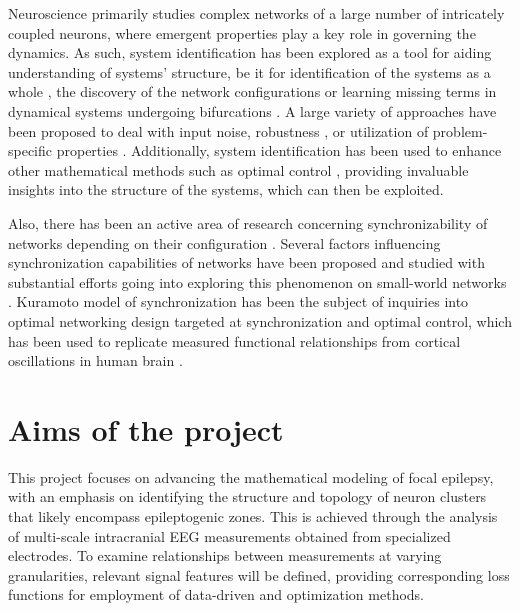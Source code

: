 \documentclass[a4paper,11pt]{scrartcl}
\begin{document}
Neuroscience primarily studies complex networks of a large number of intricately coupled neurons, where emergent properties play a key role in governing the dynamics. As such, system identification has been explored as a tool for aiding understanding of systems' structure, be it for identification of the systems as a whole \cite{Brunton2016}, the discovery of the network configurations \cite{Owens2022} or learning missing terms in dynamical systems undergoing bifurcations \cite{VortmeyerKley2021}. A large variety of approaches have been proposed to deal with input noise, robustness \cite{Kaheman2020, Rosafalco2024}, or utilization of problem-specific properties \cite{Bisheban2017, Jongeneel2022}. Additionally, system identification has been used to enhance other mathematical methods such as optimal control \cite{Morrison2021}, providing invaluable insights into the structure of the systems, which can then be exploited.

Also, there has been an active area of research concerning synchronizability of networks depending on their configuration \cite{Hong2004}. Several factors influencing synchronization capabilities of networks have been proposed and studied with substantial efforts going into exploring this phenomenon on small-world networks \cite{Nishikawa2003}. Kuramoto model of synchronization has been the subject of inquiries into optimal networking design targeted at synchronization \cite{Fazlyab2017, Nishikawa2006} and optimal control, which has been used to replicate measured functional relationships from cortical oscillations in human brain \cite{Menara2022}.

\section{Aims of the project}\label{sec:aims}


This project focuses on advancing the mathematical modeling of focal epilepsy, with an emphasis on identifying the structure and topology of neuron clusters that likely encompass epileptogenic zones. This is achieved through the analysis of multi-scale intracranial EEG measurements obtained from specialized electrodes. To examine relationships between measurements at varying granularities, relevant signal features will be defined, providing corresponding loss functions for employment of data-driven and optimization methods.
\end{document}
